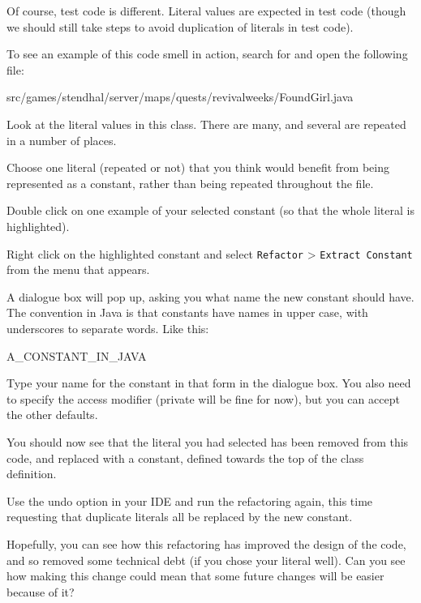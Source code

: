\documentclass[
]{book}
\newenvironment{Shaded}{\begin{snugshade}}{\end{snugshade}}
\newcommand{\NormalTok}[1]{#1}
\begin{document}
Of course, test code is different. Literal values are expected in test code (though we should still take steps to avoid duplication of literals in test code).

To see an example of this code smell in action, search for and open the following file:

\begin{Shaded}
\begin{Highlighting}[]
\NormalTok{src/games/stendhal/server/maps/quests/revivalweeks/FoundGirl.java}
\end{Highlighting}
\end{Shaded}

Look at the literal values in this class. There are many, and several are repeated in a number of places.

Choose one literal (repeated or not) that you think would benefit from being represented as a constant, rather than being repeated throughout the file.

Double click on one example of your selected constant (so that the whole literal is highlighted).

Right click on the highlighted constant and select \texttt{Refactor} \textgreater{} \texttt{Extract\ Constant} from the menu that appears.

A dialogue box will pop up, asking you what name the new constant should have. The convention in Java is that constants have names in upper case, with underscores to separate words. Like this:

\begin{Shaded}
\begin{Highlighting}[]
\NormalTok{A\_CONSTANT\_IN\_JAVA}
\end{Highlighting}
\end{Shaded}

Type your name for the constant in that form in the dialogue box. You also need to specify the access modifier (private will be fine for now), but you can accept the other defaults.

You should now see that the literal you had selected has been removed from this code, and replaced with a constant, defined towards the top of the class definition.

Use the undo option in your IDE and run the refactoring again, this time requesting that duplicate literals all be replaced by the new constant.

Hopefully, you can see how this refactoring has improved the design of the code, and so removed some technical debt (if you chose your literal well). Can you see how making this change could mean that some future changes will be easier because of it?
\end{document}
